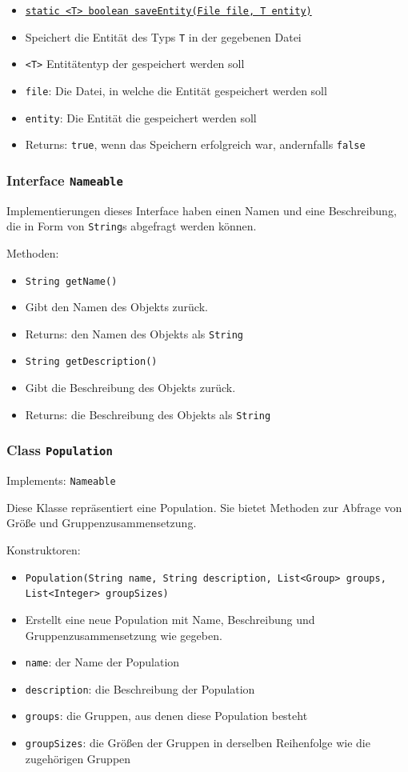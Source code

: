 \documentclass[parskip=full,11pt]{scrartcl}
\begin{document}
\begin{itemize}
	\item \underline{\texttt{static <T> boolean saveEntity(File file, T entity)}}
	\item[] Speichert die Entität des Typs \texttt{T} in der gegebenen Datei
	\item[] \texttt{<T>} Entitätentyp der gespeichert werden soll
	\item[] \texttt{file}: Die Datei, in welche die Entität gespeichert werden soll
	\item[] \texttt{entity}: Die Entität die gespeichert werden soll
	\item[]Returns: \texttt{true}, wenn das Speichern erfolgreich war, andernfalls \texttt{false}
\end{itemize}


\subsubsection{Interface \texttt{Nameable}}

Implementierungen dieses Interface haben einen Namen und eine Beschreibung, die in Form von \texttt{String}s abgefragt werden können.

Methoden:
\begin{itemize}\itemsep -10pt
\item \texttt{String getName()}
\item[] Gibt den Namen des Objekts zurück.
\item[] Returns: den Namen des Objekts als \texttt{String}

\item \texttt{String getDescription()}
\item[] Gibt die Beschreibung des Objekts zurück.
\item[] Returns: die Beschreibung des Objekts als \texttt{String}
\end{itemize}

\subsubsection{Class \texttt{Population}}
Implements: \texttt{Nameable}

Diese Klasse repräsentiert eine Population. Sie bietet Methoden zur Abfrage von Größe und Gruppenzusammensetzung.

Konstruktoren:
\begin{itemize}\itemsep -10pt
\item \texttt{Population(String name, String description, List<Group> groups, List<Integer> groupSizes)}
\item[] Erstellt eine neue Population mit Name, Beschreibung und Gruppenzusammensetzung wie gegeben.
\item[] \texttt{name}: der Name der Population
\item[] \texttt{description}: die Beschreibung der Population
\item[] \texttt{groups}: die Gruppen, aus denen diese Population besteht
\item[] \texttt{groupSizes}: die Größen der Gruppen in derselben Reihenfolge wie die zugehörigen Gruppen
\end{itemize}
\end{document}
